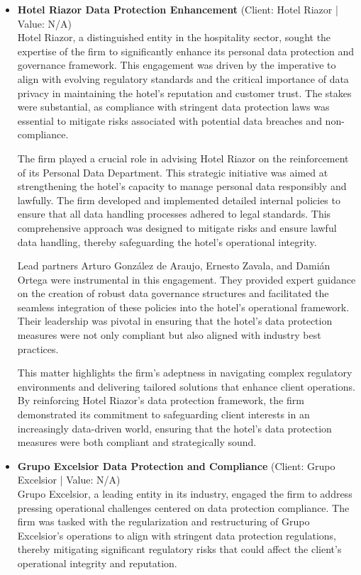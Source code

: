 \documentclass[11pt]{article}
\begin{document}
\begin{itemize}
This matter exemplifies the firm's ability to deliver bespoke solutions that address intricate regulatory challenges, reinforcing the submission's overarching thesis of providing strategic legal counsel that enhances client resilience in a rapidly evolving regulatory landscape.
\item \textbf{Hotel Riazor Data Protection Enhancement} (Client: Hotel Riazor | Value: N/A)\\ Hotel Riazor, a distinguished entity in the hospitality sector, sought the expertise of the firm to significantly enhance its personal data protection and governance framework. This engagement was driven by the imperative to align with evolving regulatory standards and the critical importance of data privacy in maintaining the hotel's reputation and customer trust. The stakes were substantial, as compliance with stringent data protection laws was essential to mitigate risks associated with potential data breaches and non-compliance.

The firm played a crucial role in advising Hotel Riazor on the reinforcement of its Personal Data Department. This strategic initiative was aimed at strengthening the hotel's capacity to manage personal data responsibly and lawfully. The firm developed and implemented detailed internal policies to ensure that all data handling processes adhered to legal standards. This comprehensive approach was designed to mitigate risks and ensure lawful data handling, thereby safeguarding the hotel's operational integrity.

Lead partners Arturo González de Araujo, Ernesto Zavala, and Damián Ortega were instrumental in this engagement. They provided expert guidance on the creation of robust data governance structures and facilitated the seamless integration of these policies into the hotel's operational framework. Their leadership was pivotal in ensuring that the hotel's data protection measures were not only compliant but also aligned with industry best practices.

This matter highlights the firm's adeptness in navigating complex regulatory environments and delivering tailored solutions that enhance client operations. By reinforcing Hotel Riazor's data protection framework, the firm demonstrated its commitment to safeguarding client interests in an increasingly data-driven world, ensuring that the hotel's data protection measures were both compliant and strategically sound.
\item \textbf{Grupo Excelsior Data Protection and Compliance} (Client: Grupo Excelsior | Value: N/A)\\ Grupo Excelsior, a leading entity in its industry, engaged the firm to address pressing operational challenges centered on data protection compliance. The firm was tasked with the regularization and restructuring of Grupo Excelsior's operations to align with stringent data protection regulations, thereby mitigating significant regulatory risks that could affect the client's operational integrity and reputation. 


\end{itemize}
\end{document}
